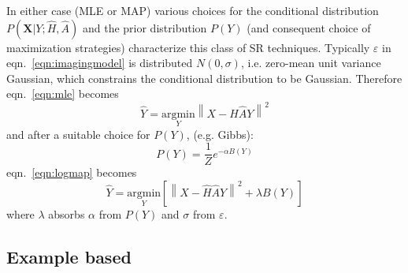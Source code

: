 In either case (MLE or MAP) various choices for the conditional distribution $P\left(\bm{X} | Y; \hat{H}, \hat{A}\right)$ and the prior distribution $P(Y)$ (and consequent choice of maximization strategies) characterize this class of SR techniques.
%
Typically $\varepsilon$ in eqn.~\ref{eqn:imagingmodel} is distributed $N(0, \sigma)$, i.e. zero-mean unit variance Gaussian, which constrains the conditional distribution to be Gaussian.
%
Therefore eqn.~\ref{eqn:mle} becomes
\begin{equation}
    \hat{Y} = \underset{Y}{\text{argmin}}\left\| X-\hat{H}\hat{A}Y \right\|^2
    \label{eqn:minmle}
\end{equation}
and after a suitable choice for $P(Y)$, (e.g. Gibbs\cite{Hardie1997}):
\[
    P(Y) = \frac{1}{Z}e^{-\alpha B(Y)}
\]
eqn.~\ref{eqn:logmap} becomes
\begin{equation}
    \hat{Y} = \underset{Y}{\text{argmin}}\left[ \left\| X-\hat{H}\hat{A}Y \right\|^2 +\lambda B(Y)\right]
    \label{eqn:minmap}
\end{equation}
where $\lambda$ absorbs $\alpha$ from $P(Y)$ and $\sigma$ from $\varepsilon$.




%

\subsection{Example based}
